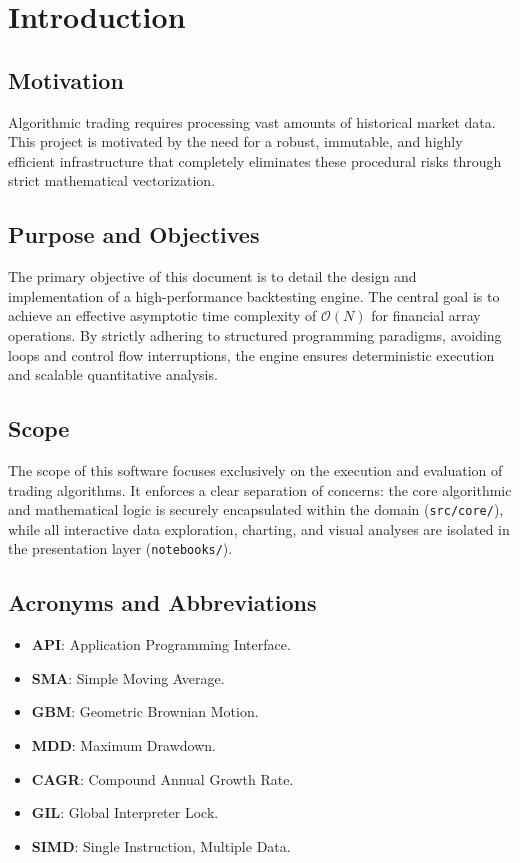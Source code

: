 \chapter{Introduction}

\section{Motivation}
Algorithmic trading requires processing vast amounts of historical market data. This project is motivated by the need for a robust, immutable, and highly efficient infrastructure that completely eliminates these procedural risks through strict mathematical vectorization.

\section{Purpose and Objectives}
The primary objective of this document is to detail the design and implementation of a high-performance backtesting engine. The central goal is to achieve an effective asymptotic time complexity of \(\mathcal{O}(N)\) for financial array operations. By strictly adhering to structured programming paradigms, avoiding loops and control flow interruptions, the engine ensures deterministic execution and scalable quantitative analysis.

\section{Scope}
The scope of this software focuses exclusively on the execution and evaluation of trading algorithms. It enforces a clear separation of concerns: the core algorithmic and mathematical logic is securely encapsulated within the domain (\texttt{src/core/}), while all interactive data exploration, charting, and visual analyses are isolated in the presentation layer (\texttt{notebooks/}).

\section{Acronyms and Abbreviations}
\begin{itemize}
    \item \textbf{API}: Application Programming Interface.
    \item \textbf{SMA}: Simple Moving Average.
    \item \textbf{GBM}: Geometric Brownian Motion.
    \item \textbf{MDD}: Maximum Drawdown.
    \item \textbf{CAGR}: Compound Annual Growth Rate.
    \item \textbf{GIL}: Global Interpreter Lock.
    \item \textbf{SIMD}: Single Instruction, Multiple Data.
\end{itemize}
